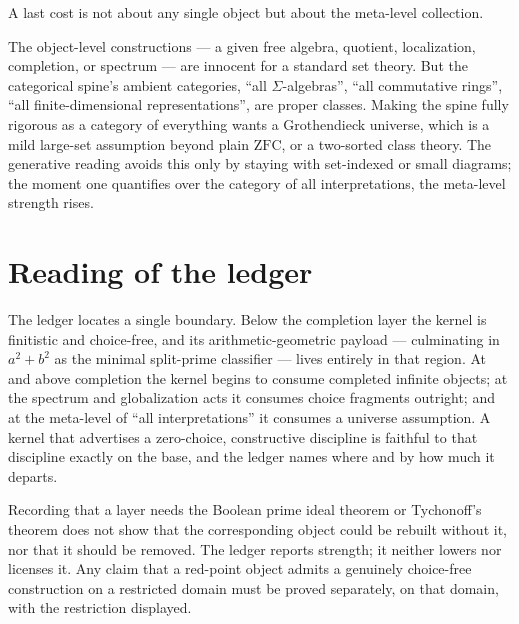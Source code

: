 A last cost is not about any single object but about the meta-level collection.

\begin{principle}
\label{prin:ontology-kernel-universe-caveat}
The object-level constructions --- a given free algebra, quotient,
localization, completion, or spectrum --- are innocent for a standard set
theory.  But the categorical spine's ambient categories, ``all
$\Sigma$-algebras'', ``all commutative rings'', ``all finite-dimensional
representations'', are proper classes.  Making the spine fully rigorous as a
category of everything wants a Grothendieck universe, which is a mild large-set
assumption beyond plain $\mathrm{ZFC}$, or a two-sorted class theory.  The
generative reading avoids this only by staying with set-indexed or small
diagrams; the moment one quantifies over the category of all interpretations,
the meta-level strength rises.
\end{principle}

\section{Reading of the ledger}
\label{sec:ontology-kernel-ledger-reading}

The ledger locates a single boundary.  Below the completion layer the kernel is
finitistic and choice-free, and its arithmetic-geometric payload --- culminating
in $a^2+b^2$ as the minimal split-prime classifier --- lives entirely in that
region.  At and above completion the kernel begins to consume completed infinite
objects; at the spectrum and globalization acts it consumes choice fragments
outright; and at the meta-level of ``all interpretations'' it consumes a
universe assumption.  A kernel that advertises a zero-choice, constructive
discipline is faithful to that discipline exactly on the base, and the ledger
names where and by how much it departs.

\begin{principle}
\label{prin:ontology-kernel-ledger-descriptive}
Recording that a layer needs the Boolean prime ideal theorem or Tychonoff's
theorem does not show that the corresponding object could be rebuilt without it,
nor that it should be removed.  The ledger reports strength; it neither lowers
nor licenses it.  Any claim that a red-point object admits a genuinely
choice-free construction on a restricted domain must be proved separately, on
that domain, with the restriction displayed.
\end{principle}
